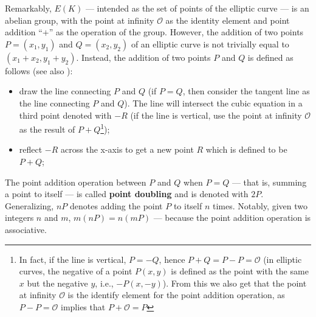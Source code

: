 Remarkably, $E(K)$ --- intended as the set of points of the elliptic curve --- is an abelian group, with the point at infinity $\mathcal{O}$ as the identity element and point addition ``$+$'' as the operation of the group. However, the addition of two points $P = (x_1, y_1)$ and $Q = (x_2, y_2)$ of an elliptic curve is not trivially equal to $(x_1+x_2, y_1+y_2)$. Instead, the addition of two points $P$ and $Q$ is defined as follows (see also ):

\begin{itemize}
	\item draw the line connecting $P$ and $Q$ (if $P = Q$, then consider the tangent line as the line connecting $P$ and $Q$). The line will intersect the cubic equation in a third point denoted with $-R$ (if the line is vertical, use the point at infinity $\mathcal{O}$ as the result of $P + Q$\footnote{In fact, if the line is vertical, $P = -Q$, hence $P + Q = P - P = \mathcal{O}$ (in elliptic curves, the negative of a point $P(x, y)$ is defined as the point with the same $x$ but the negative $y$, i.e., $-P(x, -y)$). From this we also get that the point at infinity $\mathcal{O}$ is the identify element for the point addition operation, as $P - P = \mathcal{O}$ implies that $P + \mathcal{O} = P$});
	\item reflect $-R$ across the x-axis to get a new point $R$ which is defined to be $P + Q$;
\end{itemize}

The point addition operation between $P$ and $Q$ when $P = Q$ --- that is, summing a point to itself --- is called \textbf{point doubling} and is denoted with $2P$. Generalizing, $nP$ denotes adding the point $P$ to itself $n$ times. Notably, given two integers $n$ and $m$, $m(nP) = n(mP)$ --- because the point addition operation is associative.


